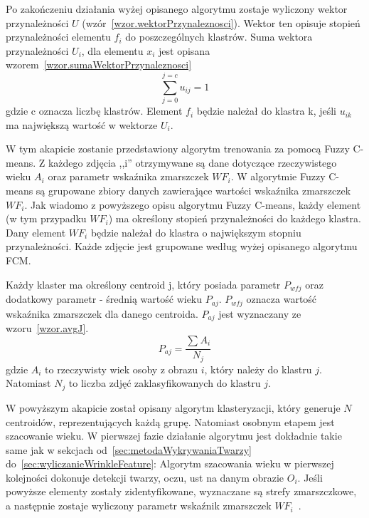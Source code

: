 \documentclass[a4paper,twoside,12pt]{book}
\begin{document}
    Po zakończeniu działania wyżej opisanego algorytmu zostaje wyliczony wektor przynależności $U$
    (wzór~\ref{wzor.wektorPrzynaleznosci}). Wektor ten opisuje stopień przynależności elementu $f_{i}$ do
    poszczególnych klastrów.
    Suma wektora przynależności $U_{i}$, dla elementu $x_{i}$ jest opisana
    wzorem~\ref{wzor.sumaWektorPrzynaleznosci}
    \large
    \begin{equation}
        \sum_{j=0}^{j=c} u_{ij}=1
        \label{wzor.sumaWektorPrzynaleznosci}
    \end{equation}
    \normalsize
    gdzie c oznacza liczbę klastrów.
    Element $f_{i}$ będzie należał do klastra k, jeśli $u_{ik}$ ma największą wartość w wektorze $U_{i}$.

    W tym akapicie zostanie przedstawiony algorytm trenowania za pomocą Fuzzy C-means.
    Z każdego zdjęcia ,,i'' otrzymywane są dane dotyczące rzeczywistego wieku $A_{i}$ oraz parametr wskaźnika
    zmarszczek
    $WF_{i}$.
    W algorytmie Fuzzy C-means są grupowane zbiory danych zawierające wartości wskaźnika zmarszczek $WF_{i}$.
    Jak wiadomo z powyższego opisu algorytmu Fuzzy C-means, każdy element (w tym przypadku $WF_{i}$) ma określony
    stopień
    przynależności do każdego klastra. Dany element $WF_{i}$ będzie należał do klastra o największym stopniu
    przynależności. Każde zdjęcie jest grupowane według wyżej opisanego algorytmu FCM.

    Każdy klaster ma określony centroid j, który posiada parametr $P_{wfj}$  oraz dodatkowy parametr - średnią
    wartość wieku $P_{aj}$. $P_{wfj}$ oznacza wartość wskaźnika zmarszczek dla danego centroida.
    $P_{aj}$ jest wyznaczany ze wzoru~\ref{wzor.avgJ}.
    \large
    \begin{equation}
        P_{aj}=\frac{\sum_{}^{}A_{i}}{N_{j}}
        \label{wzor.avgJ}
    \end{equation}
    \normalsize
    gdzie $A_{i}$ to rzeczywisty wiek osoby z obrazu $i$, który należy do klastru $j$.
    Natomiast $N_{j}$ to liczba zdjęć zaklasyfikowanych do klastru $j$.

    W powyższym akapicie został opisany algorytm klasteryzacji, który generuje $N$ centroidów, reprezentujących każdą
    grupę. Natomiast osobnym etapem jest szacowanie wieku.
    W pierwszej fazie działanie algorytmu jest dokładnie takie same jak w sekcjach od~\ref{sec:metodaWykrywaniaTwarzy}
    do~\ref{sec:wyliczanieWrinkleFeature}:
    Algorytm szacowania wieku w pierwszej kolejności dokonuje detekcji twarzy, oczu, ust na danym obrazie $O_{i}$.
    Jeśli powyższe elementy zostały zidentyfikowane, wyznaczane są strefy zmarszczkowe,
    a następnie zostaje wyliczony parametr wskaźnik zmarszczek $WF_{i}$~\cite{wrinkleFeatures}.
\end{document}

